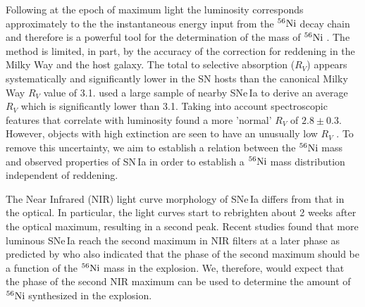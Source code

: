 \documentclass[traditabstract]{aa}
\newcommand{\Mni}{$\rm M_{^{56}Ni}$~}
\newcommand{\Nif}{$
\rm ^{56}Ni$ }
\begin{document}
Following \citet{Arnett1982} at the epoch of maximum light the luminosity corresponds approximately to the the instantaneous energy input from the \Nif decay chain and therefore is a powerful tool for the determination of the mass of \Nif.  The method is limited, in part, by the accuracy of the correction for reddening in the Milky Way and the host galaxy. The total to selective absorption ($R_V$) appears systematically and significantly lower in the SN hosts than the canonical Milky Way $R_V$ value of 3.1. \citet{Nobili2008} used a large sample of nearby SNe\,Ia to derive an average $R_V$ which is significantly lower than 3.1. Taking into account spectroscopic features that correlate with luminosity \citet{Chotard2011} found a more 'normal' $R_V$ of $2.8 \pm 0.3$. However,  objects with high extinction are seen to have an unusually low $R_V$ \citep{Phillips2013, Patat2014}. To remove this uncertainty, we aim to establish a relation between the \Nif mass and observed properties of SN\,Ia in order to establish a \Nif mass distribution independent of reddening. %

The Near Infrared (NIR) light curve morphology of SNe\,Ia differs from that in the optical. In particular, the light curves start to rebrighten about 2 weeks after the optical maximum, resulting in a second peak. 
Recent studies \citep[e.g.][]{Biscardi2012,Dhawan2015}  found that more luminous SNe\,Ia reach the second maximum in NIR  filters at a later phase as predicted by \citet{Kasen2006} who also indicated that the phase of the second maximum should be a function of the \Nif mass in the explosion.  We, therefore, would expect that the phase of the second NIR maximum can be used to determine the amount of \Nif  synthesized in the explosion. 
\end{document}
